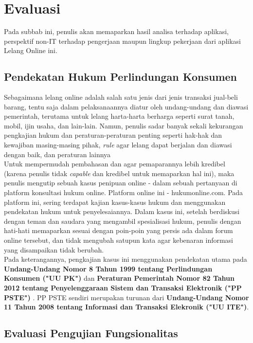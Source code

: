 \section{Evaluasi}
	Pada subbab ini, penulis akan memaparkan hasil analisa terhadap aplikasi, perspektif non-IT terhadap pengerjaan maupun lingkup pekerjaan dari aplikasi Lelang Online ini.
		
	\subsection{Pendekatan Hukum Perlindungan Konsumen}
	
	Sebagaimana lelang online adalah salah satu jenis dari jenis transaksi jual-beli barang, tentu saja dalam pelaksanaannya diatur oleh undang-undang dan diawasi pemerintah, terutama untuk lelang harta-harta berharga seperti surat tanah, mobil, ijin usaha, dan lain-lain. Namun, penulis sadar banyak sekali kekurangan pengkajian hukum dan peraturan-peraturan penting seperti hak-hak dan kewajiban masing-masing pihak, \textit{rule} agar lelang dapat berjalan dan diawasi dengan baik, dan peraturan lainnya\\
	Untuk mempermudah pembahasan dan agar pemaparannya lebih kredibel (karena penulis tidak \textit{capable} dan kredibel untuk memaparkan hal ini), maka penulis mengutip sebuah kasus penipuan online - dalam sebuah pertanyaan di platform konsultasi hukum online. Platform online ini - hukumonline.com. Pada platform ini, sering terdapat kajian kasus-kasus hukum dan menggunakan pendekatan hukum untuk penyelesaiannya. Dalam kasus ini, setelah berdiskusi dengan teman dan saudara yang mengambil spesialisasi hukum, penulis dengan hati-hati memaparkan sesuai dengan poin-poin yang persis ada dalam forum online tersebut, dan tidak mengubah satupun kata agar kebenaran informasi yang disampaikan tidak berubah.\\
	\indent Pada keterangannya, pengkajian kasus ini menggunakan pendekatan utama pada \textbf{Undang-Undang Nomor 8 Tahun 1999 tentang Perlindungan Konsumen ("UU PK") } dan \textbf{Peraturan Pemerintah Nomor 82 Tahun 2012 tentang Penyelenggaraan Sistem dan Transaksi Elektronik ("PP PSTE") }. PP PSTE sendiri merupakan turunan dari \textbf{Undang-Undang Nomor 11 Tahun 2008 tentang Informasi dan Transaksi Elekronik ("UU ITE")}.
	
			
	\subsection{Evaluasi Pengujian Fungsionalitas}
	
